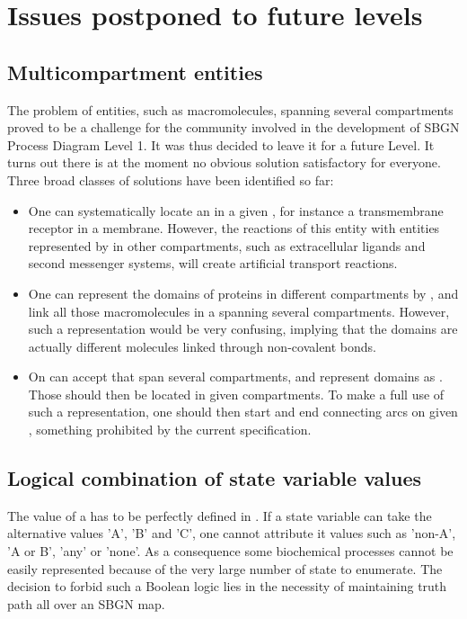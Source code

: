 \chapter{Issues postponed to future levels}\label{sec:postponed}

\section{Multicompartment entities}
\label{sec: unresolved multi-comp ents}

The problem of entities, such as macromolecules, spanning several compartments proved to be a challenge for the community involved in the development of SBGN Process Diagram Level 1. It was thus decided to leave it for a future Level. It turns out there is at the moment no obvious solution satisfactory for everyone. Three broad classes of solutions have been identified so far:

\begin{itemize}
\item One can systematically locate an  in a given , for instance a transmembrane receptor in a membrane. However, the reactions of this entity with entities represented by  in other compartments, such as extracellular ligands and second messenger systems, will create artificial transport reactions.
\item One can represent the domains of proteins in different compartments by , and link all those macromolecules in a  spanning several compartments. However, such a representation would be very confusing, implying that the domains are actually different molecules linked through non-covalent bonds.
\item On can accept  that span several compartments, and represent domains as . Those  should then be located in given compartments. To make a full use of such a representation, one should then start and end connecting arcs on given , something prohibited by the current specification.
\end{itemize}

\section{Logical combination of state variable values}

The value of a  has to be perfectly defined in \SBGNPDLone. If a state variable can take the alternative values 'A', 'B' and 'C',  one cannot attribute it values such as 'non-A', 'A or B', 'any' or 'none'. As a consequence some biochemical processes cannot be easily represented because of the very large number of state to enumerate. The decision to forbid such a Boolean logic lies in the necessity of maintaining truth path all over an SBGN map. 

